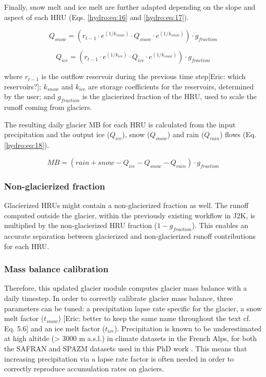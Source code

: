Finally, snow melt and ice melt are further adapted depending on the slope and aspect of each HRU (Eqs. \ref{hydro:eq:16} and \ref{hydro:eq:17}).

\begin{equation} \label{hydro:eq:16}
Q_{snow} = (r_{t-1 }\cdot e^{(1/k_{snow})} \cdot Q_{snow} \cdot e^{(1/k_{snow})}) \cdot g_{fraction}
\end{equation} 

\begin{equation} \label{hydro:eq:17}
Q_{ice} = (r_{t-1} \cdot e^{(1/k_{ice})} \cdot Q_{ice} \cdot e^{(1/k_{snow})}) \cdot g_{fraction}
\end{equation} 

where $r_{t-1}$ is the outflow reservoir during the previous time step[Eric: which reservoirs?]; $k_{snow}$ and $k_{ice}$ are storage coefficients for the reservoirs, determined by the user; and $g_{fraction}$ is the glacierized fraction of the HRU, used to scale the runoff coming from glaciers. 

The resulting daily glacier MB for each HRU is calculated from the input precipitation and the output ice ($Q_{ice}$), snow ($Q_{snow}$) and rain ($Q_{rain}$) flows (Eq. \ref{hydro:eq:18}).

\begin{equation} \label{hydro:eq:18}
MB = (rain + snow - Q_{ice} - Q_{snow} - Q_{rain}) \cdot g_{fraction}
\end{equation} 

\subsubsection{Non-glacierized fraction}

Glacierized HRUs might contain a non-glacierized fraction as well. The runoff computed outside the glacier, within the previously existing workflow in J2K, is multiplied by the non-glacierized HRU fraction ($1 - g_{fraction}$). This enables an accurate separation between glacierized and non-glacierized runoff contributions for each HRU. 

\subsubsection{Mass balance calibration}

Therefore, this updated glacier module computes glacier mass balance with a daily timestep. In order to correctly calibrate glacier mass balance, three parameters can be tuned: a precipitation lapse rate specific for the glacier, a snow melt factor ($t_{snow}$) [Eric: better to keep the same name throughout the text cf. Eq. 5.6] and an ice melt factor ($t_{ice}$). Precipitation is known to be underestimated at high altitde (> 3000 m a.s.l.) in climate datasets in the French Alps, for both the SAFRAN and SPAZM datasets used in this PhD work \citep{vionnet_numerical_2016}. This means that increasing precipitation via a lapse rate factor is often needed in order to correctly reproduce accumulation rates on glaciers. 

